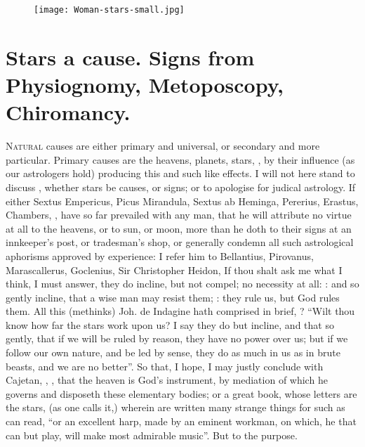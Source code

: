\cleartoleftpage{}
\begin{figure}[p]
  \begingroup
  \centering
  \texttt{[image: Woman-stars-small.jpg]}
  \label{fig:womanstars}
\end{figure}

\clearpage{}
\thispagestyle{titleontop}

\section[Heavens, Planets, Stars]{Stars a cause. Signs from Physiognomy, Metoposcopy, Chiromancy.}\label{sec:heavens-planets-stars}

\lettrine{N}{atural} causes are either primary and universal, or secondary and
more particular. Primary causes are the heavens, planets, stars, \etc{}, by
their influence (as our astrologers hold) producing this and such like effects.
I will not here stand to discuss , whether stars be causes, or
signs; or to apologise for judical astrology. If either Sextus Empericus, Picus
Mirandula, Sextus ab Heminga, Pererius, Erastus, Chambers, \etc{}, have so far
prevailed with any man, that he will attribute no virtue at all to the heavens,
or to sun, or moon, more than he doth to their signs at an innkeeper's post, or
tradesman's shop, or generally condemn all such astrological aphorisms approved
by experience: I refer him to Bellantius, Pirovanus, Marascallerus, Goclenius,
Sir Christopher Heidon, \etc{} If thou shalt ask me what I think, I must
answer,  they do incline, but not compel; no necessity at
all: : and so gently incline, that a
wise man may resist them; : they rule us, but
God rules them. All this (methinks) Joh. de Indagine hath
comprised in brief, ? \etc{}
\enquote{Wilt thou know how far the stars work upon us? I say they do but incline, and
that so gently, that if we will be ruled by reason, they have no power over us;
but if we follow our own nature, and be led by sense, they do as much in us as
in brute beasts, and we are no better}. So that, I hope, I may justly conclude
with Cajetan, ,
\etc{}, that the heaven is God's instrument, by mediation of which he governs
and disposeth these elementary bodies; or a great book, whose letters are the
stars, (as one calls it,) wherein are written many strange things for such as
can read, \enquote{or an excellent harp, made by an eminent
workman, on which, he that can but play, will make most admirable music}. But
to the purpose.

